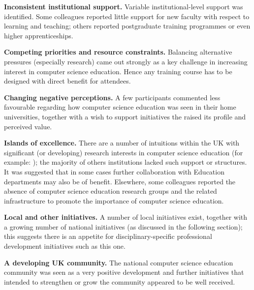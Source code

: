 \documentclass[sigconf]{acmart}
\begin{document}
\noindent\textbf{Inconsistent institutional support.}
Variable institutional-level support was identified. Some colleagues reported little support for new faculty with respect to learning and teaching; others reported postgraduate training programmes or even higher apprenticeships.

\noindent\textbf{Competing priorities and resource constraints.}
Balancing alternative pressures (especially research) came out strongly as a key challenge in increasing interest in computer science education. Hence any training course has to be designed with direct benefit for attendees. 

\noindent\textbf{Changing negative perceptions.}
A few participants commented less favourable regarding how computer science education was seen in their home universities, together with a wish to support initiatives the raised its profile and perceived value.

\noindent\textbf{Islands of excellence.}
There are a number of intuitions within the UK with significant (or developing) research interests in computer science education (for example: ); the majority of others institutions lacked such support or structures. It was suggested that in some cases further collaboration with Education departments may also be of benefit. Elsewhere, some colleagues reported the absence of computer science education research groups and the related infrastructure to promote the importance of computer science education.

\noindent\textbf{Local and other initiatives.}
A number of local initiatives exist, together with a growing number of national initiatives (as discussed in the following section); this suggests there is an appetite for disciplinary-specific professional development initiatives such as this one.

\noindent\textbf{A developing UK community.}
The national computer science education community was seen as a very positive development and further initiatives that intended to strengthen or grow the community appeared to be well received.
\end{document}
